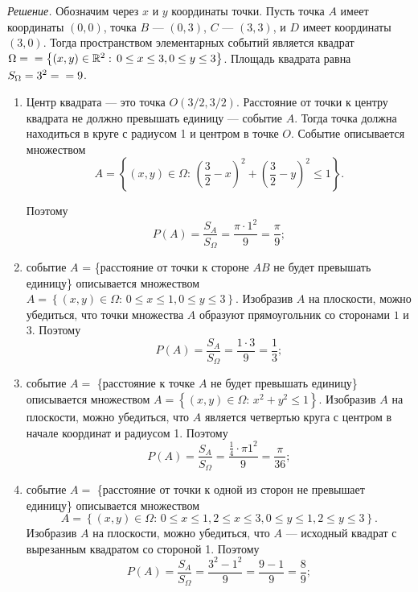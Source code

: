 \textit{Решение.} Обозначим через $x$ и $y$ координаты точки.
Пусть точка $A$ имеет координаты $ \left( 0, 0 \right) $,
точка $B$ --- $ \left( 0, 3 \right) $, $C$ --- $ \left( 3, 3 \right) $, и $D$ имеет координаты $ \left( 3, 0 \right) $.
Тогда пространством элементарных событий является квадрат
$ \Omega = \\
=\left\{ \left( x, y \right) \in \mathbb{R}^2: \,
0 \leq x \leq 3,
0 \leq y \leq 3 \right\} $.
Площадь квадрата равна $S_{\Omega} = 3^2 = \\ = 9$.

\begin{enumerate}[label=\alph*)]
\item Центр квадрата --- это точка $ O \left( 3/2, 3/2 \right) $.
Расстояние от точки к центру квадрата не должно превышать единицу --- событие $A$.
Тогда точка должна находиться в круге с радиусом 1 и центром в точке $O$.
Событие описывается множеством
$$A =
\left\{ \left( x, y \right) \in \Omega: \,
\left( \frac{3}{2} - x \right)^2 + \left( \frac{3}{2} - y \right)^2 \leq 1 \right\}.$$

Поэтому
$$P \left( A \right) =
\frac{S_A}{S_{ \Omega }} =
\frac{ \pi \cdot 1^2}{9} =
\frac{ \pi }{9};$$

\item событие $A$ =
\{расстояние от точки к стороне $AB$ не будет превышать единицу\}
описывается множеством $A = \left\{ \left( x, y \right) \in \Omega: \, 0 \leq x \leq 1, 0 \leq y \leq 3 \right\} $.
Изобразив $A$ на плоскости, можно убедиться, что точки множества $A$ образуют прямоугольник со сторонами $1$ и $3$.
Поэтому
$$P \left( A \right) =
\frac{S_A}{S_{ \Omega }} =
\frac{1 \cdot 3}{9} =
\frac{1}{3};$$

\item событие $A =$
\{расстояние к точке $A$ не будет превышать единицу\}
описывается множеством $A =\left\{ \left( x, y \right) \in \Omega: \, x^2 + y^2 \leq 1 \right\} $.
Изобразив $A$ на плоскости, можно убедиться, что $A$ является четвертью круга с центром в начале координат и радиусом 1.
Поэтому
$$P \left( A \right) =
\frac{S_A}{S_{ \Omega }}=
\frac{ \frac{1}{4} \cdot \pi 1^2}{9} =
\frac{ \pi }{36};$$

\item событие $A =$
\{расстояние от точки к одной из сторон не превышает единицу\}
описывается множеством
$$A =
\left\{ \left( x, y \right) \in \Omega: \,
0 \leq x \leq 1,
2 \leq x \leq 3,
0 \leq y \leq 1,
2 \leq y \leq 3 \right\}.$$
Изобразив $A$ на плоскости, можно убедиться, что $A$ --- исходный квадрат с вырезанным квадратом со стороной 1.
Поэтому
$$P \left( A \right) =
\frac{S_A}{S_{ \Omega }} =
\frac{3^2 - 1^2}{9} =
\frac{9-1}{9} =
\frac{8}{9};$$


\end{enumerate}
